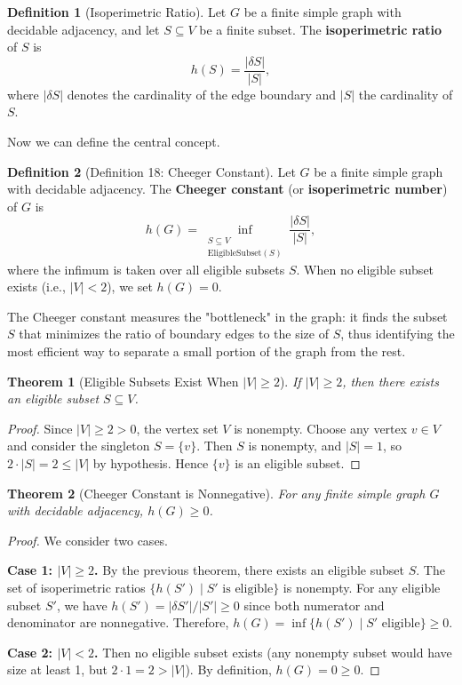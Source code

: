 \documentclass[11pt]{article}
\theoremstyle{plain}
\newtheorem*{theorem}{Theorem}
\theoremstyle{definition}
\newtheorem*{definition}{Definition}
\theoremstyle{remark}
\begin{document}
\begin{definition}[Isoperimetric Ratio]
Let $G$ be a finite simple graph with decidable adjacency, and let $S \subseteq V$ be a finite subset. The \textbf{isoperimetric ratio} of $S$ is
\[
h(S) = \frac{|\delta S|}{|S|},
\]
where $|\delta S|$ denotes the cardinality of the edge boundary and $|S|$ the cardinality of $S$.
\end{definition}

Now we can define the central concept.

\begin{definition}[Definition 18: Cheeger Constant]
Let $G$ be a finite simple graph with decidable adjacency. The \textbf{Cheeger constant} (or \textbf{isoperimetric number}) of $G$ is
\[
h(G) = \inf_{\substack{S \subseteq V \\ \text{EligibleSubset}(S)}} \frac{|\delta S|}{|S|},
\]
where the infimum is taken over all eligible subsets $S$. When no eligible subset exists (i.e., $|V| < 2$), we set $h(G) = 0$.
\end{definition}

The Cheeger constant measures the "bottleneck" in the graph: it finds the subset $S$ that minimizes the ratio of boundary edges to the size of $S$, thus identifying the most efficient way to separate a small portion of the graph from the rest.

\begin{theorem}[Eligible Subsets Exist When $|V| \geq 2$]
If $|V| \geq 2$, then there exists an eligible subset $S \subseteq V$.
\end{theorem}

\begin{proof}
Since $|V| \geq 2 > 0$, the vertex set $V$ is nonempty. Choose any vertex $v \in V$ and consider the singleton $S = \{v\}$. Then $S$ is nonempty, and $|S| = 1$, so $2 \cdot |S| = 2 \leq |V|$ by hypothesis. Hence $\{v\}$ is an eligible subset.
\end{proof}

\begin{theorem}[Cheeger Constant is Nonnegative]
For any finite simple graph $G$ with decidable adjacency, $h(G) \geq 0$.
\end{theorem}

\begin{proof}
We consider two cases.

\textbf{Case 1: $|V| \geq 2$.} By the previous theorem, there exists an eligible subset $S$. The set of isoperimetric ratios $\{h(S') \mid S' \text{ is eligible}\}$ is nonempty. For any eligible subset $S'$, we have $h(S') = |\delta S'|/|S'| \geq 0$ since both numerator and denominator are nonnegative. Therefore, $h(G) = \inf\{h(S') \mid S' \text{ eligible}\} \geq 0$.

\textbf{Case 2: $|V| < 2$.} Then no eligible subset exists (any nonempty subset would have size at least 1, but $2 \cdot 1 = 2 > |V|$). By definition, $h(G) = 0 \geq 0$.
\end{proof}
\end{document}
